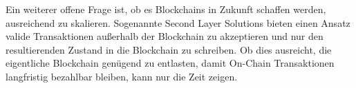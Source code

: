 \noindent Ein weiterer offene Frage ist, ob es Blockchains in Zukunft schaffen werden, ausreichend zu skalieren. Sogenannte Second Layer Solutions bieten einen Ansatz valide Transaktionen außerhalb der Blockchain zu akzeptieren und nur den resultierenden Zustand in die Blockchain zu schreiben. Ob dies ausreicht, die eigentliche Blockchain genügend zu entlasten, damit On-Chain Transaktionen langfristig bezahlbar bleiben, kann nur die Zeit zeigen.

